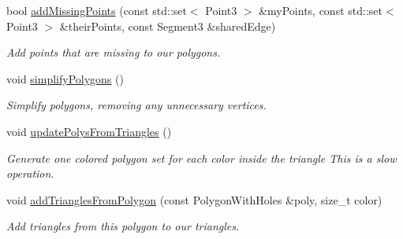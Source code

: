 \begin{DoxyCompactItemize}
bool \mbox{\hyperlink{classpepr3d_1_1_triangle_detail_a9d193b7c01d33c650b58738aed37e0e6}{add\+Missing\+Points}} (const std\+::set$<$ Point3 $>$ \&my\+Points, const std\+::set$<$ Point3 $>$ \&their\+Points, const Segment3 \&shared\+Edge)
\begin{DoxyCompactList}\small\item\em Add points that are missing to our polygons. \end{DoxyCompactList}\item 
\mbox{\label{classpepr3d_1_1_triangle_detail_a8b6a41c7c881886bde6d1543beac68c8}} 
void \mbox{\hyperlink{classpepr3d_1_1_triangle_detail_a8b6a41c7c881886bde6d1543beac68c8}{simplify\+Polygons}} ()
\begin{DoxyCompactList}\small\item\em Simplify polygons, removing any unnecessary vertices. \end{DoxyCompactList}\item 
\mbox{\label{classpepr3d_1_1_triangle_detail_a3a0599a7b678c981256cfc1a2a720dd4}} 
void \mbox{\hyperlink{classpepr3d_1_1_triangle_detail_a3a0599a7b678c981256cfc1a2a720dd4}{update\+Polys\+From\+Triangles}} ()
\begin{DoxyCompactList}\small\item\em Generate one colored polygon set for each color inside the triangle This is a slow operation. \end{DoxyCompactList}\item 
\mbox{\label{classpepr3d_1_1_triangle_detail_a9e9541120fb03635e37a298df6a60dc3}} 
void \mbox{\hyperlink{classpepr3d_1_1_triangle_detail_a9e9541120fb03635e37a298df6a60dc3}{add\+Triangles\+From\+Polygon}} (const Polygon\+With\+Holes \&poly, size\+\_\+t color)
\begin{DoxyCompactList}\small\item\em Add triangles from this polygon to our triangles. \end{DoxyCompactList}\end{DoxyCompactItemize}
